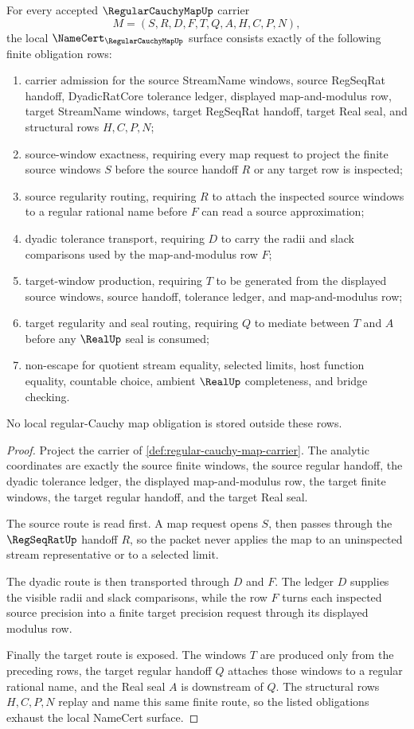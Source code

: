 \begin{theorem}
\label{thm:regular-cauchy-map-namecert-obligations}
For every accepted $\RegularCauchyMapUp$ carrier
$$
M=(S,R,D,F,T,Q,A,H,C,P,N),
$$
the local $\NameCert_{\RegularCauchyMapUp}$ surface consists exactly of the following finite obligation rows:
\begin{enumerate}
\item carrier admission for the source StreamName windows, source RegSeqRat handoff, DyadicRatCore tolerance ledger, displayed map-and-modulus row, target StreamName windows, target RegSeqRat handoff, target Real seal, and structural rows $H,C,P,N$;
\item source-window exactness, requiring every map request to project the finite source windows $S$ before the source handoff $R$ or any target row is inspected;
\item source regularity routing, requiring $R$ to attach the inspected source windows to a regular rational name before $F$ can read a source approximation;
\item dyadic tolerance transport, requiring $D$ to carry the radii and slack comparisons used by the map-and-modulus row $F$;
\item target-window production, requiring $T$ to be generated from the displayed source windows, source handoff, tolerance ledger, and map-and-modulus row;
\item target regularity and seal routing, requiring $Q$ to mediate between $T$ and $A$ before any $\RealUp$ seal is consumed;
\item non-escape for quotient stream equality, selected limits, host function equality, countable choice, ambient $\RealUp$ completeness, and bridge checking.
\end{enumerate}
No local regular-Cauchy map obligation is stored outside these rows.
\end{theorem}
\begin{proof}
Project the carrier of \autoref{def:regular-cauchy-map-carrier}. The analytic coordinates are exactly the source finite windows, the source regular handoff, the dyadic tolerance ledger, the displayed map-and-modulus row, the target finite windows, the target regular handoff, and the target Real seal.

The source route is read first. A map request opens $S$, then passes through the $\RegSeqRatUp$ handoff $R$, so the packet never applies the map to an uninspected stream representative or to a selected limit.

The dyadic route is then transported through $D$ and $F$. The ledger $D$ supplies the visible radii and slack comparisons, while the row $F$ turns each inspected source precision into a finite target precision request through its displayed modulus row.

Finally the target route is exposed. The windows $T$ are produced only from the preceding rows, the target regular handoff $Q$ attaches those windows to a regular rational name, and the Real seal $A$ is downstream of $Q$. The structural rows $H,C,P,N$ replay and name this same finite route, so the listed obligations exhaust the local NameCert surface.
\end{proof}

